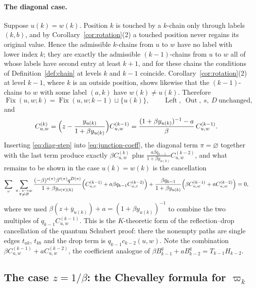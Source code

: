\documentclass[11pt]{article}
\newcommand{\Fix}{\operatorname{Fix}}
\newcommand{\Left}{\operatorname{Left}}
\newcommand{\Out}{\operatorname{Out}}
\begin{document}
\paragraph{The diagonal case.}
Suppose $u(k)=w(k)$. Position $k$ is touched by a $k$-chain only
through labels $(k,b)$, and by Corollary~\ref{cor:rotation}(2) a
touched position never regains its original value. Hence the
admissible $k$-chains from $u$ to $w$ have no label with lower index
$k$; they are exactly the admissible $(k-1)$-chains from $u$ to $w$
all of whose labels have second entry at least $k+1$,
and for these chains the conditions of Definition~\ref{def:chain} at
levels $k$ and $k-1$ coincide. Corollary~\ref{cor:rotation}(2) at
level $k-1$, where $k$ is an outside position, shows likewise
that the $(k-1)$-chains to $w$ with some label $(a,k)$ have
$w(k)\neq u(k)$. Therefore
\[
 \Fix(u,w;k)=\Fix(u,w;k-1)\sqcup\{u(k)\},\qquad
 \Left,\ \Out,\ s,\ D\ \text{unchanged},
\]
and
\begin{equation}\label{eq:diag-step}
 C^{(k)}_{u,w}=\Bigl(z-\frac{y_{u(k)}}{1+\beta y_{u(k)}}\Bigr)
               C^{(k-1)}_{u,w}
 =\frac{(1+\beta y_{u(k)})^{-1}-a}{\beta}\,C^{(k-1)}_{u,w}.
\end{equation}
Inserting \eqref{eq:diag-step} into \eqref{eq:junction-coeff}, the
diagonal term $\pi=\varnothing$ together with the last term produce
exactly $\beta C^{(k)}_{u,w}$ plus
$\frac{a\beta q_{k-1}}{1+\beta y_{u(k)}}C^{(k-2)}_{u,w}$,
and what remains to be shown in the case $u(k)=w(k)$ is the
cancellation
\begin{equation}\label{eq:diag-cancel}
 \sum_{v}\ \sum_{\substack{\pi\colon v\to w\\ \pi\neq\varnothing}}
     \frac{(-\beta)^{s(\pi)}\beta^{t(\pi)}q^{D(\pi)}}
          {1+\beta y_{v(\pi)(k)}}
     \Bigl(C^{(k-1)}_{u,v}+a\beta q_{k-1}C^{(k-2)}_{u,v}\Bigr)
 +\frac{\beta q_{k-1}}{1+\beta y_{u(k)}}
     \Bigl(\beta C^{(k-1)}_{u,w}+aC^{(k-2)}_{u,w}\Bigr)=0,
\end{equation}
where we used $\beta(z+\overline y_{u(k)})+a=(1+\beta y_{u(k)})^{-1}$
to combine the two multiples of $q_{k-1}C^{(k-1)}_{u,w}$.
This is the $K$-theoretic form of the reflection--drop cancellation
of the quantum Schubert proof: there the nonempty paths are single
edges $t_{ak}$, $t_{kb}$ and the drop term is $q_{k-1}c_{k-2}(u,w)$.
Note the combination $\beta C^{(k-1)}_{u,w}+aC^{(k-2)}_{u,w}$, the
coefficient analogue of $\beta B_{k-1}^q+aB_{k-2}^q=T_{k-1}H_{k-2}$.

\subsection{The case \texorpdfstring{$z=1/\beta$}{z=1/beta}: the Chevalley formula for \texorpdfstring{$\varpi_k$}{varpi\_k}}
\label{sec:a-zero}
\end{document}

